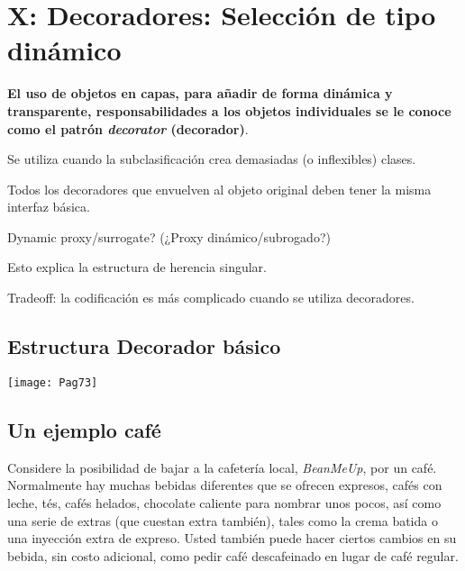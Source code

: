 \section*{\texorpdfstring{X: Decoradores: \newline  Selección de tipo dinámico}{X: Decoradores:  Selección Tipo dinámico}}
\label{sec:xdstd}



\textbf{El uso de objetos en capas, para añadir de forma dinámica y transparente, responsabilidades a los objetos individuales se le conoce como el patrón \textit{decorator} (decorador)}. \newline

Se utiliza cuando la subclasificación crea demasiadas (o inflexibles) clases.   \newline

Todos los decoradores que envuelven al objeto original deben tener la misma interfaz básica. \newline

Dynamic proxy/surrogate? (¿Proxy dinámico/subrogado?)  \newline

Esto explica la estructura de herencia singular.    \newline

Tradeoff:  la codificación es más complicado cuando se utiliza decoradores.

\newpage

\subsection*{Estructura Decorador básico}
\label{subsec:edb}

\texttt{[image: Pag73]}

\subsection*{Un ejemplo café}
\label{subsec:uec}

Considere la posibilidad de bajar a la cafetería local, \textit{BeanMeUp}, por un café. Normalmente hay muchas bebidas diferentes que se ofrecen \-\- expresos, cafés con leche, tés, cafés helados, chocolate caliente para nombrar unos pocos, así como una serie de extras (que cuestan extra también), tales como la crema batida o una inyección extra de expreso. Usted también puede hacer ciertos cambios en su bebida, sin costo adicional, como pedir café descafeinado en lugar de café regular.     \newline

